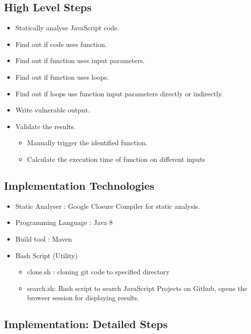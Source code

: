 \documentclass[authoryear,preprint]{sigplanconf}
\begin{document}
\subsection{High Level Steps}
\begin{itemize}
	\item Statically analyse JavaScript code.
	\item Find out if code uses function.
	\item Find out if function uses input parameters.
	\item Find out if function uses loops.
	\item Find out if loops use function input parameters directly or indirectly.
	\item Write vulnerable output.
	\item Validate the results.
			\begin{itemize}
				\item Manually trigger the identified function.
				\item Calculate the execution time of function on different inputs
			\end{itemize}
\end{itemize}

\subsection{Implementation Technologies}
\begin{itemize}
	\item Static Analyser : Google Closure Compiler for static analysis.
	\item Programming Language : Java 8
	\item Build tool : Maven
	\item Bash Script (Utility)
			\begin{itemize}
				\item clone.sh : cloning git code to specified directory
				\item search.sh: Bash script to search JavaScript Projects on Github, opens the browser session for displaying results.\end{itemize}
\end{itemize}


\subsection{Implementation: Detailed Steps}
\end{document}
